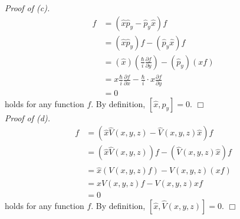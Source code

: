 \documentclass{article}
\begin{document}
\emph{Proof of (c).}
\begin{align*}
[\hat{x}, \hat{p}_y]f
&= (\hat{x}\hat{p}_y - \hat{p}_y \hat{x})f \\
&= (\hat{x}\hat{p}_y)f - (\hat{p}_y \hat{x})f \\
&= (\hat{x})\left( \frac{\hbar}{i}\frac{\partial f}{\partial y} \right)
  - (\hat{p}_y)(xf) \\
&= x \frac{\hbar}{i}\frac{\partial f}{\partial x}
  - \frac{\hbar}{i} \cdot x \frac{\partial f}{\partial y} \\
&= 0
\end{align*}
holds for any function $f$.
By definition,
$[\hat{x}, \hat{p}_y] = 0$.
$\Box$ \\

\emph{Proof of (d).}
\begin{align*}
[\hat{x}, \hat{V}(x,y,z)]f
&= (\hat{x}\hat{V}(x,y,z) - \hat{V}(x,y,z) \hat{x})f \\
&= (\hat{x}\hat{V}(x,y,z))f - (\hat{V}(x,y,z) \hat{x})f \\
&= \hat{x}(V(x,y,z)f) - \hat{V}(x,y,z)(xf) \\
&= x V(x,y,z)f - V(x,y,z) xf \\
&= 0
\end{align*}
holds for any function $f$.
By definition,
$[\hat{x}, \hat{V}(x,y,z)] = 0$.
$\Box$ \\
\end{document}
